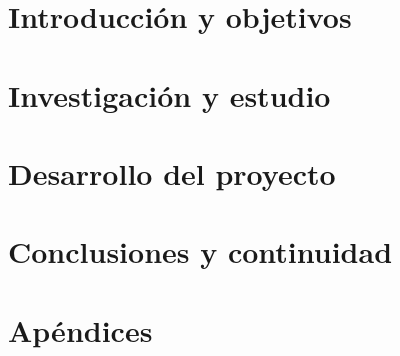 
\cleardoubleevenemptypage
\part{Introducción y objetivos}
\label{part:introduccion-objetivos}






\cleardoubleevenemptypage
\part{Investigación y estudio}
\label{part:investigacion-estudio}



\cleardoubleevenemptypage
\part{Desarrollo del proyecto}
\label{part:desarrollo-proyecto}



\cleardoubleevenemptypage
\part{Conclusiones y continuidad}
\label{part:conclusiones}



\cleardoubleevenemptypage
\part{Apéndices}
\label{part:apendices}
\appendix


